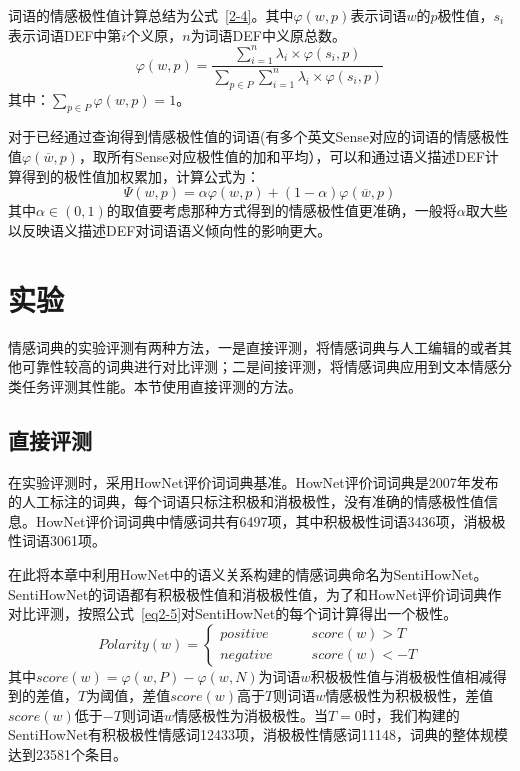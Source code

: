 词语的情感极性值计算总结为公式~\ref{2-4}。其中$\varphi(w,p)$表示词语$w$的$p$极性值，$s_i$表示词语DEF中第$i$个义原，$n$为词语DEF中义原总数。
\begin{equation}
\label{2-4}
\varphi(w,p)=\dfrac{\sum_{i=1}^n\lambda_i\times\varphi(s_i,p)}{\sum_{p\in P}\sum_{i=1}^n\lambda_i\times\varphi(s_i,p)}
\end{equation}
其中：$\sum_{p \in P}\varphi(w,p)=1$。

对于已经通过查询得到情感极性值的词语(有多个英文Sense对应的词语的情感极性值$\varphi(\overline{w},p)$，取所有Sense对应极性值的加和平均），可以和通过语义描述DEF计算得到的极性值加权累加，计算公式为：
\begin{equation}
\Psi(w,p)=\alpha \varphi(w,p)+(1-\alpha)\varphi(\overline{w},p)
\end{equation}
其中$ \alpha \in (0,1)$的取值要考虑那种方式得到的情感极性值更准确，一般将$ \alpha $取大些以反映语义描述DEF对词语语义倾向性的影响更大。

\section{实验}
情感词典的实验评测有两种方法，一是直接评测，将情感词典与人工编辑的或者其他可靠性较高的词典进行对比评测；二是间接评测，将情感词典应用到文本情感分类任务评测其性能。本节使用直接评测的方法。

\subsection{直接评测}
在实验评测时，采用HowNet评价词词典基准。HowNet评价词词典是2007年发布的人工标注的词典，每个词语只标注积极和消极极性，没有准确的情感极性值信息。HowNet评价词词典中情感词共有6497项，其中积极极性词语3436项，消极极性词语3061项。

在此将本章中利用HowNet中的语义关系构建的情感词典命名为SentiHowNet。SentiHowNet的词语都有积极极性值和消极极性值，为了和HowNet评价词词典作对比评测，按照公式~\ref{eq2-5}对SentiHowNet的每个词计算得出一个极性。
\begin{equation}
\label{eq2-5}
Polarity(w)=\begin{cases}
positive \qquad & score(w)>T\\
negative \qquad & score(w)<-T
\end{cases}
\end{equation}
其中$ score(w)= \varphi(w,P)-\varphi(w,N)$为词语$ w $积极极性值与消极极性值相减得到的差值，$ T $为阈值，差值$ score(w)$高于$ T $则词语$ w $情感极性为积极极性，差值$ score(w)$低于$ -T $则词语$ w $情感极性为消极极性。当$ T=0 $时，我们构建的SentiHowNet有积极极性情感词12433项，消极极性情感词11148，词典的整体规模达到23581个条目。

